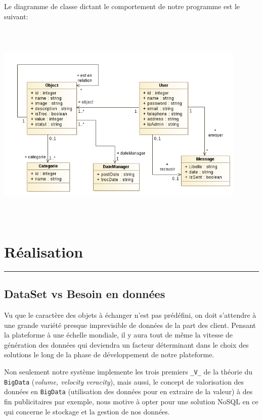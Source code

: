 \documentclass[12pt]{report}
\begin{document}
	Le diagramme de classe dictant le comportement de notre programme est le suivant:
		 	\begin{center}
		 	
		 		\includegraphics[scale=1, width=0.9\textwidth, height=10cm]{class}
		 		
		 		\label{class}
		 	\end{center}
	 
	
	
	\newpage
	\section{\sc Réalisation}
		\rule{1 \textwidth}{0.5pt} \textbf{}
		\vspace{2em}
		\subsection{\sc DataSet vs Besoin en données}
			Vu que le caractère des objets à échanger n'est pas prédéfini, on doit s'attendre à une grande variété presque imprevisible de données de la part des client. Pensant la plateforme à une échelle mondiale, il y aura tout de même la vitesse de génération des données qui deviendra un facteur déterminant dans le choix des solutions le long de la phase de développement de notre plateforme. 
			
			Non seulement notre système implemente les trois premiers {\tt \_V\_} de la théorie du {\tt BigData} ({\it volume, velocity veracity}), mais aussi, le concept de valorisation des données en {\tt BigData} (utilisation des données pour en extraire de la valeur) à des fin publicitaires par exemple, nous motive à opter pour une solution {NoSQL} en ce qui concerne le stockage et la gestion de nos données.
			
\end{document}
